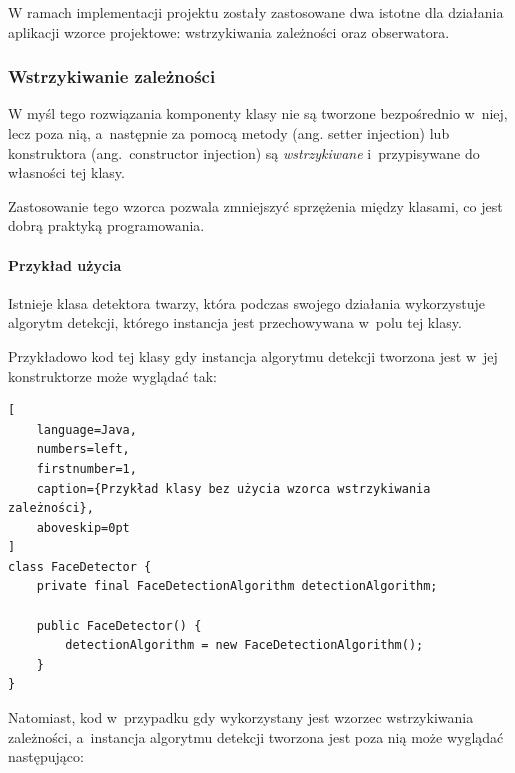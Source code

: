 W ramach implementacji projektu zostały zastosowane dwa istotne dla działania aplikacji wzorce projektowe: wstrzykiwania zależności oraz obserwatora. 


\subsubsection{Wstrzykiwanie zależności}

W myśl tego rozwiązania komponenty klasy nie są tworzone bezpośrednio w~niej, lecz poza nią, a~następnie za pomocą metody (ang. setter injection) lub konstruktora (ang.~constructor injection) są \textit{wstrzykiwane} i~przypisywane do własności tej klasy. 

\par

Zastosowanie tego wzorca pozwala zmniejszyć sprzężenia między klasami, co jest dobrą praktyką programowania. 




\paragraph{Przykład użycia} Istnieje klasa detektora twarzy, która podczas swojego działania wykorzystuje algorytm detekcji, którego instancja jest przechowywana w~polu tej klasy.

\par

Przykładowo kod tej klasy gdy instancja algorytmu detekcji tworzona jest w~jej konstruktorze może wyglądać tak:

\vspace{5mm}

\begin{addmargin}[10mm]{0mm}
\begin{lstlisting}[
    language=Java,
    numbers=left,
    firstnumber=1,
    caption={Przykład klasy bez użycia wzorca wstrzykiwania zależności},
    aboveskip=0pt
]
class FaceDetector {
    private final FaceDetectionAlgorithm detectionAlgorithm;
    
    public FaceDetector() {
        detectionAlgorithm = new FaceDetectionAlgorithm();
    }
}
\end{lstlisting}
\end{addmargin}

\vspace{5mm}

Natomiast, kod w~przypadku gdy wykorzystany jest wzorzec wstrzykiwania zależności, a~instancja algorytmu detekcji tworzona jest poza nią może wyglądać następująco:

